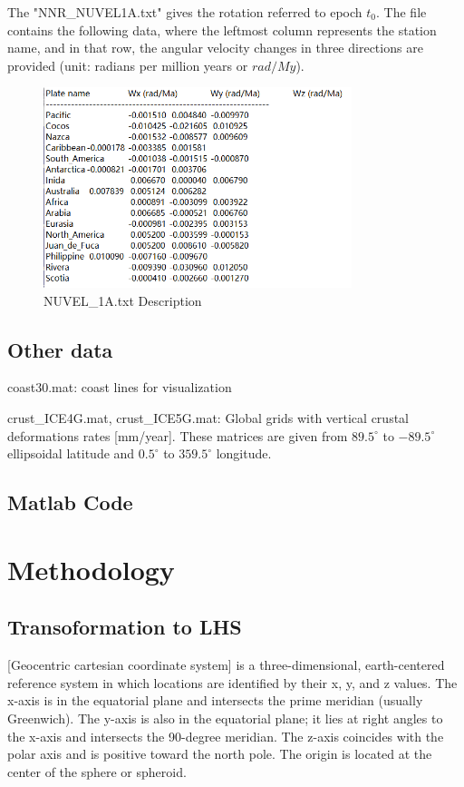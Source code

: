 \documentclass{article}
\begin{document}
The "NNR\_NUVEL1A.txt" gives the rotation referred to epoch $t_0$. 
The file contains the following data, where the leftmost column represents the station name, 
and in that row, the angular velocity changes in three directions are provided (unit: radians per million years or $rad/My$).
\begin{figure}[htbp]
    \centering
    \includegraphics[width=9cm]{../source/nuvel.png}
    \caption{NUVEL\_1A.txt Description}
    \label{fig:Nuvel-1A}
\end{figure}

\subsection{Other data}
\noindent coast30.mat: coast lines for visualization

\noindent crust\_ICE4G.mat, crust\_ICE5G.mat: Global grids with vertical crustal deformations rates [mm/year].
These matrices are given from $89.5^{\circ}$ to $-89.5^{\circ}$ ellipsoidal latitude and $0.5^{\circ}$ to $359.5^{\circ}$ longitude.

\subsection{Matlab Code}

\section{Methodology}
\subsection{Transoformation to LHS}
[Geocentric cartesian coordinate system] is a three-dimensional, earth-centered reference system in which locations are identified by their x, y, and z values. 
The x-axis is in the equatorial plane and intersects the prime meridian (usually Greenwich). 
The y-axis is also in the equatorial plane; it lies at right angles to the x-axis and intersects the 90-degree meridian. 
The z-axis coincides with the polar axis and is positive toward the north pole. The origin is located at the center of the sphere or spheroid.
\end{document}
